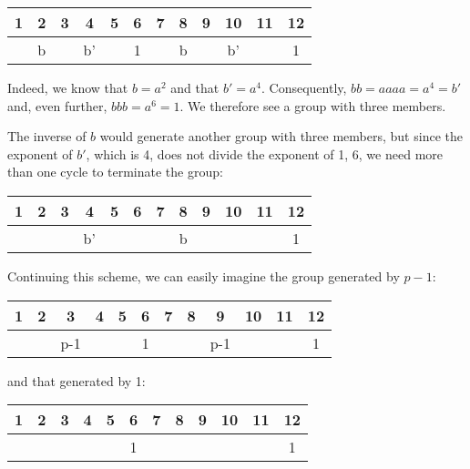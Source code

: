 \documentclass{scrreprt}
\begin{document}
\begin{center}
\begin{tabular}{|c|c|c|c|c|c|c|c|c|c|c|c}
 1 &  2 &  3 &  4 &  5 &  6 &  7 &  8 &  9 & 10 & 11 & 12 \\\hline
   &  b &    & b' &    &  1 &    &  b &    & b' &    &  1   
\end{tabular}
\end{center}

Indeed, we know that $b=a^2$ and that $b'=a^4$.
Consequently, $bb = aaaa = a^4 = b'$ and,
even further, $bbb = a^6 = 1$.
We therefore see a group with three members.

The inverse of $b$ would generate another group with three members,
but since the exponent of $b'$, which is 4, does not divide
the exponent of 1, 6, 
we need more than one cycle to terminate the group:

\begin{center}
\begin{tabular}{|c|c|c|c|c|c|c|c|c|c|c|c}
 1 &  2 &  3 &  4 &  5 &  6 &  7 &  8 &  9 & 10 & 11 & 12 \\\hline
   &    &    & b' &    &    &    &  b &    &    &    &  1   
\end{tabular}
\end{center}

Continuing this scheme, we can easily imagine
the group generated by $p-1$:

\begin{center}
\begin{tabular}{|c|c|c|c|c|c|c|c|c|c|c|c}
 1 &  2 &  3 &  4 &  5 &  6 &  7 &  8 &  9 & 10 & 11 & 12 \\\hline
   &    &p-1 &    &    &  1 &    &    &p-1 &    &    &  1   
\end{tabular}
\end{center}

and that generated by 1:

\begin{center}
\begin{tabular}{|c|c|c|c|c|c|c|c|c|c|c|c}
 1 &  2 &  3 &  4 &  5 &  6 &  7 &  8 &  9 & 10 & 11 & 12 \\\hline
   &    &    &    &    &  1 &    &    &    &    &    &  1   
\end{tabular}
\end{center}
\end{document}
